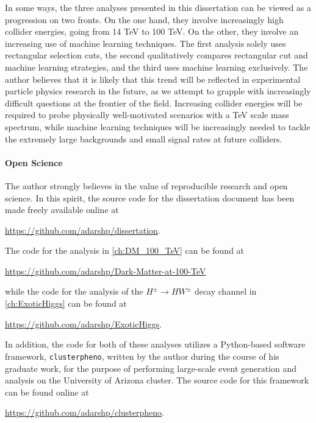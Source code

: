 In some ways, the three analyses presented in this dissertation can be viewed as a progression on two fronts. On the one hand, they involve increasingly high collider energies, going from 14 TeV to 100 TeV. On the other, they involve an increasing use of machine learning techniques. The first analysis solely uses rectangular selection cuts, the second qualitatively compares rectangular cut and machine learning strategies, and the third uses machine learning exclusively. The author believes that it is likely that this trend will be reflected in experimental particle physics research in the future, as we attempt to grapple with increasingly difficult questions at the frontier of the field. Increasing collider energies will be required to probe physically well-motivated scenarios with a TeV scale mass spectrum, while machine learning techniques will be increasingly needed to tackle the extremely large backgrounds and small signal rates at future colliders.

\paragraph{Open Science} The author strongly believes in the value of reproducible research and open science. In this spirit, the source code for the dissertation document has been made freely available online at

\url{https://github.com/adarshp/dissertation}.

\noindent The code for the analysis in \autoref{ch:DM_100_TeV} can be found at

\url{https://github.com/adarshp/Dark-Matter-at-100-TeV}

\noindent while the code for the analysis of the $H^\pm\rightarrow HW^\pm$ decay channel in \autoref{ch:ExoticHiggs} can be found at

\url{https://github.com/adarshp/ExoticHiggs}.

\noindent In addition, the code for both of these analyses utilizes a Python-based software framework, \texttt{clusterpheno}, written by the author during the course of his graduate work, for the purpose of performing large-scale event generation and analysis on the University of Arizona cluster. The source code for this framework can be found online at 

\url{https://github.com/adarshp/clusterpheno}.
